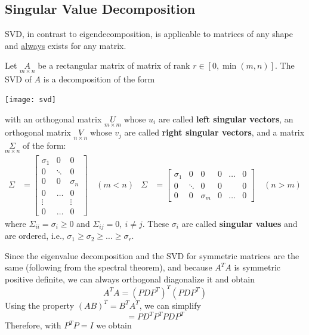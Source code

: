 \documentclass{article}
\begin{document}
\subsection{Singular Value Decomposition}
SVD, in contrast to eigendecomposition, is applicable to matrices of any
shape and \underline{always} exists for any matrix.
\begin{theorem}
    Let $\underset{m\times n}A$ be a rectangular matrix of matrix of rank
    $r\in[0,\min(m,n)]$. The SVD of $A$ is a decomposition of the form
    \begin{center}
        \texttt{[image: svd]}
    \end{center}
    with an orthogonal matrix $\underset{m\times m}U$ whose $u_i$ are called
    \textbf{left singular vectors}, an orthogonal matrix $\underset{n\times
    n}V$ whose $v_j$ are called \textbf{right singular vectors}, and a matrix
    $\underset{m\times n}\Sigma$ of the form:
    $$
    \begin{aligned}
        \Sigma&=\begin{bmatrix}
            \sigma_1 & 0 & 0 \\ 
            0 & \ddots & 0 \\ 
            0 & 0 & \sigma_n \\ 
            0 & \ldots & 0 \\ 
            \vdots & & \vdots \\ 
            0 & \ldots & 0
        \end{bmatrix}\quad (m<n)&
        \Sigma&=\begin{bmatrix}
            \sigma_1 & 0 & 0 & 0 & \ldots & 0 \\ 
            0 & \ddots & 0 & 0 & & 0 \\ 
            0 & 0 & \sigma_m & 0 & \ldots & 0 
        \end{bmatrix}\quad (n>m)
    \end{aligned}
    $$
    where $\Sigma_{ii}=\sigma_i\geq0$ and $\Sigma_{ij}=0,\ i\neq j$.
    These $\sigma_i$ are called \textbf{singular values} and are ordered,
    i.e., $\sigma_1\geq\sigma_2\geq\ldots\geq\sigma_r$.
\end{theorem}
Since the eigenvalue decomposition and the SVD for symmetric matrices are the
same (following from the spectral theorem), and because $A^TA$ is symmetric
positive definite, we can always orthogonal diagonalize it and obtain 
$$A^TA=(PDP^T)^T(PDP^T)$$
Using the property $(AB)^T=B^TA^T$, we can simplify
$$=PD^TP^TPDP^T$$
Therefore, with $P^TP=I$ we obtain 
\end{document}
